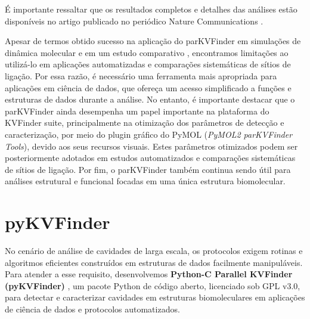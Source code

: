 \documentclass[Portugues]{phdquali}
\begin{document}
É importante ressaltar que os resultados completos e detalhes das análises estão disponíveis no artigo publicado no periódico Nature Communications \cite{ribeiro2021}.

Apesar de termos obtido sucesso na aplicação do parKVFinder em simulações de dinâmica molecular \cite{guerra2020} e em um estudo comparativo \cite{ribeiro2021}, encontramos limitações ao utilizá-lo em aplicações automatizadas e comparações sistemáticas de sítios de ligação. Por essa razão, é necessário uma ferramenta mais apropriada para aplicações em ciência de dados, que ofereça um acesso simplificado a funções e estruturas de dados durante a análise. No entanto, é importante destacar que o parKVFinder ainda desempenha um papel importante na plataforma do KVFinder suite, principalmente na otimização dos parâmetros de detecção e caracterização, por meio do plugin gráfico do PyMOL (\textit{PyMOL2 parKVFinder Tools}), devido aos seus recursos visuais. Estes parâmetros otimizados podem ser posteriormente adotados em estudos automatizados e comparações sistemáticas de sítios de ligação. Por fim, o parKVFinder também continua sendo útil para análises estrutural e funcional focadas em uma única estrutura biomolecular.



\section{pyKVFinder}

No cenário de análise de cavidades de larga escala, os protocolos exigem rotinas e algoritmos eficientes construídos em estruturas de dados facilmente manipuláveis. Para atender a esse requisito, desenvolvemos \textbf{Python-C Parallel KVFinder (pyKVFinder)} \cite{guerra2020}, um pacote Python de código aberto, licenciado sob GPL v3.0, para detectar e caracterizar cavidades em estruturas biomoleculares em aplicações de ciência de dados e protocolos automatizados. 
\end{document}
